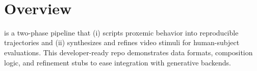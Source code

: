 \
\section{Overview}
\SystemName{} is a two-phase pipeline that (i) scripts proxemic behavior into reproducible trajectories and (ii) synthesizes and refines video stimuli for human-subject evaluations. This developer-ready repo demonstrates data formats, composition logic, and refinement stubs to ease integration with generative backends.
